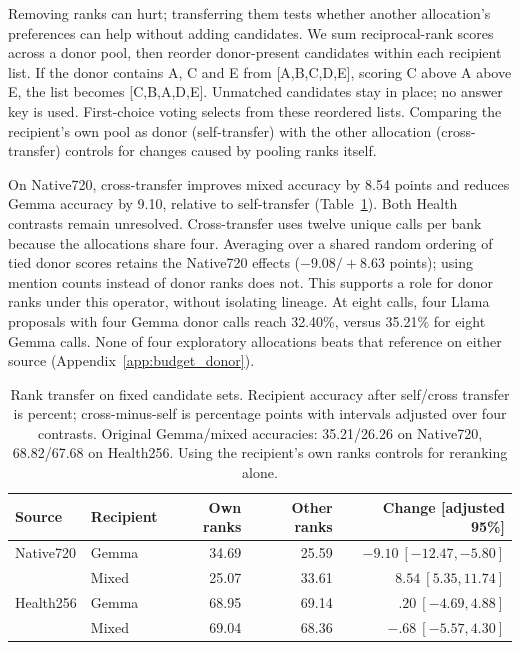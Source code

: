\documentclass{article}
\begin{document}
Removing ranks can hurt; transferring them tests whether another allocation's preferences can help without adding candidates. We sum reciprocal-rank scores across a donor pool, then reorder donor-present candidates within each recipient list. If the donor contains A, C and E from [A,B,C,D,E], scoring C above A above E, the list becomes [C,B,A,D,E]. Unmatched candidates stay in place; no answer key is used. First-choice voting selects from these reordered lists. Comparing the recipient's own pool as donor (self-transfer) with the other allocation (cross-transfer) controls for changes caused by pooling ranks itself.

On Native720, cross-transfer improves mixed accuracy by 8.54 points and reduces Gemma accuracy by 9.10, relative to self-transfer (Table~\ref{tab:rank_transfer}). Both Health contrasts remain unresolved. Cross-transfer uses twelve unique calls per bank because the allocations share four. Averaging over a shared random ordering of tied donor scores retains the Native720 effects ($-9.08/+8.63$ points); using mention counts instead of donor ranks does not. This supports a role for donor ranks under this operator, without isolating lineage. At eight calls, four Llama proposals with four Gemma donor calls reach 32.40\%, versus 35.21\% for eight Gemma calls. None of four exploratory allocations beats that reference on either source (Appendix~\ref{app:budget_donor}).

\begin{table}[t]
\centering\small
\caption{Rank transfer on fixed candidate sets. Recipient accuracy after self/cross transfer is percent; cross-minus-self is percentage points with intervals adjusted over four contrasts. Original Gemma/mixed accuracies: 35.21/26.26 on Native720, 68.82/67.68 on Health256. Using the recipient's own ranks controls for reranking alone.}
\label{tab:rank_transfer}
\begin{tabular}{llrrr}
\toprule
Source & Recipient & Own ranks & Other ranks & Change [adjusted 95\%]\\
\midrule
Native720 & Gemma &34.69&25.59&$-9.10\ [-12.47,-5.80]$\\
& Mixed &25.07&33.61&$8.54\ [5.35,11.74]$\\
Health256 & Gemma &68.95&69.14&$.20\ [-4.69,4.88]$\\
& Mixed &69.04&68.36&$-.68\ [-5.57,4.30]$\\
\bottomrule
\end{tabular}
\end{table}
\end{document}

